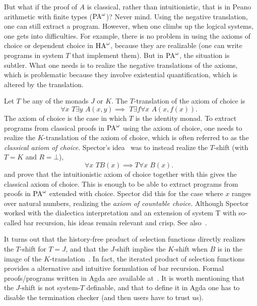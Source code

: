 But what if the proof of $A$ is classical, rather than intuitionistic,
that is in Peano arithmetic with finite types ($\operatorname{PA}^\omega$)? Never
mind. Using the negative translation, one can still extract a program.
However, when one climbs up the logical systems, one gets into
difficulties.  For example, there is no problem in using the axioms of
choice or dependent choice in $\operatorname{HA}^\omega$, because they are
realizable (one can write programs in system $T$ that implement
them). But in $\operatorname{PA}^\omega$, the situation is subtler. What one needs
is to realize the negative translations of the axioms, which is
problematic because they involve existential quantification, which is
altered by the translation.


Let $T$ be any of the monads $J$ or $K$. The $T$-translation of the
axiom of choice is
\[
\forall x \,\, T \exists y \,\, A(x,y) \implies \,\, T\exists f \forall
x \,\,A(x,f(x)).
\]
The axiom of choice is the case in which $T$ is the identity monad.
To extract programs from classical proofs in $\operatorname{PA}^\omega$ using the
axiom of choice, one needs to realize the $K$-translation of the axiom
of choice, which is often referred to as the \emph{classical axiom of
  choice}. Spector's idea~\cite{Spector(62)} was to instead realize
the $T$-shift (with $T=K$ and $R=\bot$),
\[
\forall x\,\, T B(x) \implies T\forall x \,\, B(x).
\]
and prove that the intuitionistic axiom of choice together with this
gives the classical axiom of choice.  This is enough to be able to
extract programs from proofs in $\operatorname{PA}^\omega$ extended with
choice. Spector did this for the case where $x$ ranges over natural
numbers, realizing the \emph{axiom of countable choice}. Although
Spector worked with the dialectica interpretation and an extension of
system T with so-called bar recursion, his ideas remain relevant and
crisp. See also~\cite{Berardi(98),BO(02A)}.


It turns out that the history-free product of selection functions
directly realizes the $T$-shift for $T=J$, and that the $J$-shift
implies the $K$-shift when $B$ is in the image of the
$K$-translation~\cite{EO(2010B)}.  In fact, the iterated product of
selection functions provides a alternative and intuitive formulation
of bar recursion.  Formal proofs/programs written in Agda are
available at~\cite{EO(2010):mfps:programs}. It is worth mentioning
that the $J$-shift is not system-$T$ definable, and that to define it
in Agda one has to disable the termination checker (and then users
have to trust us).


